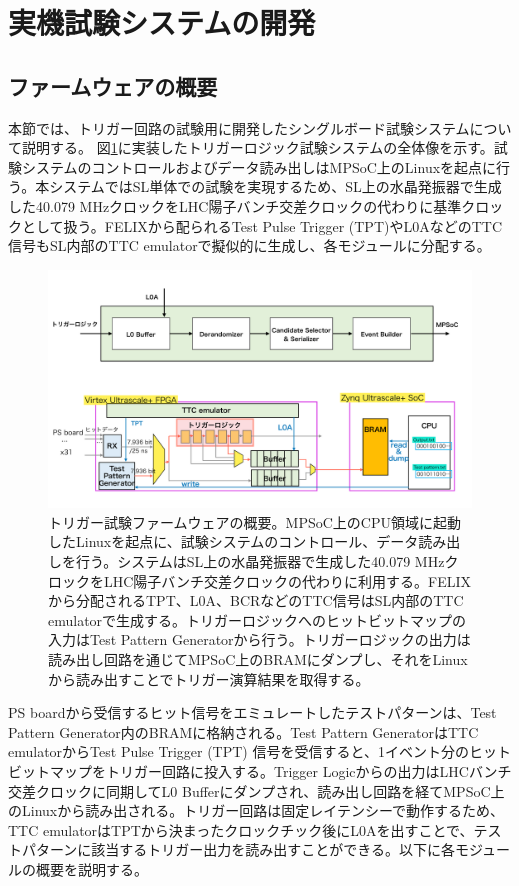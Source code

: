 \section{実機試験システムの開発}
\subsection*{ファームウェアの概要}
\label{subsec_FirmwareOverview}
本節では、トリガー回路の試験用に開発したシングルボード試験システムについて説明する。
図\ref{TestSystem_Overview}に実装したトリガーロジック試験システムの全体像を示す。試験システムのコントロールおよびデータ読み出しはMPSoC上のLinuxを起点に行う。本システムではSL単体での試験を実現するため、SL上の水晶発振器で生成した40.079 MHzクロックをLHC陽子バンチ交差クロックの代わりに基準クロックとして扱う。FELIXから配られるTest Pulse Trigger (TPT)やL0AなどのTTC信号もSL内部のTTC emulatorで擬似的に生成し、各モジュールに分配する。

\begin{figure} 
\centering
\includegraphics[width=16cm]{fig/Test/TestSystem_overview.pdf}
\caption[トリガー試験ファームウェアの概要]{トリガー試験ファームウェアの概要。MPSoC上のCPU領域に起動したLinuxを起点に、試験システムのコントロール、データ読み出しを行う。システムはSL上の水晶発振器で生成した40.079 MHzクロックをLHC陽子バンチ交差クロックの代わりに利用する。FELIXから分配されるTPT、L0A、BCRなどのTTC信号はSL内部のTTC emulatorで生成する。トリガーロジックへのヒットビットマップの入力はTest Pattern Generatorから行う。トリガーロジックの出力は読み出し回路を通じてMPSoC上のBRAMにダンプし、それをLinuxから読み出すことでトリガー演算結果を取得する。}
\label{TestSystem_Overview}
\end{figure}

PS boardから受信するヒット信号をエミュレートしたテストパターンは、Test Pattern Generator内のBRAMに格納される。Test Pattern GeneratorはTTC emulatorからTest Pulse Trigger (TPT) 信号を受信すると、1イベント分のヒットビットマップをトリガー回路に投入する。Trigger Logicからの出力はLHCバンチ交差クロックに同期してL0 Bufferにダンプされ、読み出し回路を経てMPSoC上のLinuxから読み出される。トリガー回路は固定レイテンシーで動作するため、TTC emulatorはTPTから決まったクロックチック後にL0Aを出すことで、テストパターンに該当するトリガー出力を読み出すことができる。以下に各モジュールの概要を説明する。

